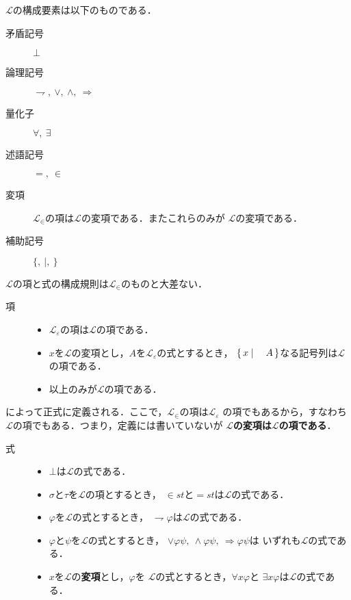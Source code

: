 	$\mathcal{L}$の構成要素は以下のものである．
	
	\begin{description}
		\item[矛盾記号] $\bot$
		\item[論理記号] $\rightharpoondown,\ \vee,\ \wedge,\ \Longrightarrow$
		\item[量化子] $\forall,\ \exists$
		\item[述語記号] $=,\ \in$
		\item[変項] $\mathcal{L}_{\in}$の項は$\mathcal{L}$の変項である．またこれらのみが
			$\mathcal{L}$の変項である．
		\item[補助記号] $\{,\ |,\ \}$
	\end{description}
	
	$\mathcal{L}$の項と式の構成規則は$\mathcal{L}_{\in}$のものと大差ない．
	
	\begin{description}
		\item[項] 
			\begin{itemize}
				\item $\mathcal{L}_{\varepsilon}$の項は$\mathcal{L}$の項である．
				\item $x$を$\mathcal{L}$の変項とし，$A$を$\mathcal{L}_{\varepsilon}$の式とするとき，
					$\left\{\, x \mid \quad A\, \right\}$なる記号列は$\mathcal{L}$の項である．
				\item 以上のみが$\mathcal{L}$の項である．
			\end{itemize}
	\end{description}
	
	によって正式に定義される．ここで，$\mathcal{L}_{\in}$の項は$\mathcal{L}_{\varepsilon}$
	の項でもあるから，すなわち$\mathcal{L}$の項でもある．つまり，定義には書いていないが
	{\bf $\mathcal{L}$の変項は$\mathcal{L}$の項である}．
	
	\begin{description}
		\item[式] 
			\begin{itemize}
				\item $\bot$は$\mathcal{L}$の式である．
				\item $\sigma$と$\tau$を$\mathcal{L}$の項とするとき，
					$\in st$と$=st$は$\mathcal{L}$の式である．
				\item $\varphi$を$\mathcal{L}$の式とするとき，
					$\rightharpoondown \varphi$は$\mathcal{L}$の式である．
				\item $\varphi$と$\psi$を$\mathcal{L}$の式とするとき，
					$\vee \varphi \psi,\ \wedge \varphi \psi,\ \Longrightarrow \varphi \psi$は
					いずれも$\mathcal{L}$の式である．
				\item $x$を$\mathcal{L}$の{\bf 変項}とし，$\varphi$を
					$\mathcal{L}$の式とするとき，$\forall x \varphi$と
					$\exists x \varphi$は$\mathcal{L}$の式である．
			\end{itemize}
	\end{description}
	
